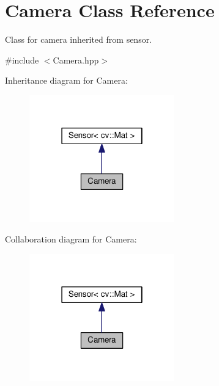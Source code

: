 \hypertarget{class_camera}{}\section{Camera Class Reference}
\label{class_camera}


Class for camera inherited from sensor.  




{\ttfamily \#include $<$Camera.\+hpp$>$}



Inheritance diagram for Camera\+:
\nopagebreak
\begin{figure}[H]
\begin{center}
\leavevmode
\includegraphics[width=178pt]{class_camera__inherit__graph}
\end{center}
\end{figure}


Collaboration diagram for Camera\+:
\nopagebreak
\begin{figure}[H]
\begin{center}
\leavevmode
\includegraphics[width=178pt]{class_camera__coll__graph}
\end{center}
\end{figure}
